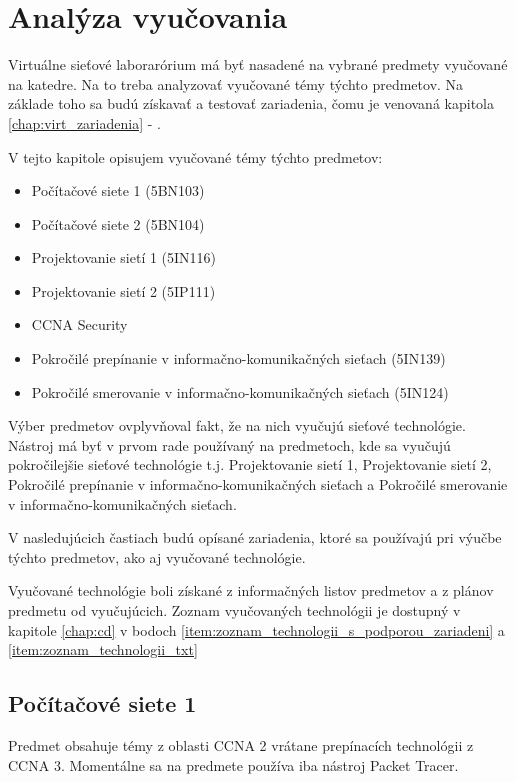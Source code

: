 \chapter{Analýza vyučovania}
\label{chap:analyza_vyucovania}

Virtuálne sieťové laborarórium má byť nasadené na vybrané predmety vyučované na katedre. Na to treba analyzovať vyučované témy týchto predmetov. Na základe toho sa budú získavať a testovať zariadenia, čomu je venovaná kapitola \ref{chap:virt_zariadenia} - .

V tejto kapitole opisujem vyučované témy týchto predmetov:

\begin{itemize}[noitemsep]
    \item Počítačové siete 1 (5BN103)
    \item Počítačové siete 2 (5BN104)
    \item Projektovanie sietí 1 (5IN116)
    \item Projektovanie sietí 2 (5IP111)
    \item CCNA Security
    \item Pokročilé prepínanie v informačno-komunikačných sieťach (5IN139)
    \item Pokročilé smerovanie v informačno-komunikačných sieťach (5IN124)
\end{itemize}

Výber predmetov ovplyvňoval fakt, že na nich vyučujú sieťové technológie. Nástroj má byť v prvom rade používaný na predmetoch, kde sa vyučujú pokročilejšie sieťové technológie t.j. Projektovanie sietí 1, Projektovanie sietí 2, Pokročilé prepínanie v informačno-komunikačných sieťach a Pokročilé smerovanie v informačno-komunikačných sieťach.

V nasledujúcich častiach budú opísané zariadenia, ktoré sa používajú pri výučbe týchto predmetov, ako aj vyučované technológie.

Vyučované technológie boli získané z informačných listov predmetov a z plánov predmetu od vyučujúcich. Zoznam vyučovaných technológii je dostupný v kapitole \ref{chap:cd} v bodoch \ref{item:zoznam_technologii_s_podporou_zariadeni} a \ref{item:zoznam_technologii_txt}




\section{Počítačové siete 1}

Predmet obsahuje témy z oblasti CCNA 2 vrátane prepínacích technológii z CCNA 3. Momentálne sa na predmete používa iba nástroj Packet Tracer.

